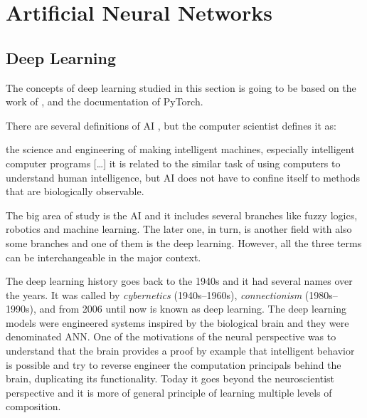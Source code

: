 \section{Artificial Neural Networks}\label{sec:ann}

\subsection{Deep Learning}\label{sec:deep_learning}

The concepts of deep learning studied in this section is going to be based on the work of \textcite{goodfellow2016}, \textcite{haykin1999} and the documentation of PyTorch.

There are several definitions of AI \cite{winston1992}, but the  computer scientist \textcite{mccarthy2007} defines it as:
%
\begin{citacao}[english]
    [\ldots] the science and engineering of making intelligent machines, especially intelligent computer programs [\ldots] it is related to the similar task of using computers to understand human intelligence, but AI does not have to confine itself to methods that are biologically observable.
\end{citacao}
The big area of study is the AI and it includes several branches like fuzzy logics, robotics and machine learning.
The later one, in turn, is another field with also some branches and one of them is the deep learning.
However, all the three terms can be interchangeable in the major context.

The deep learning history goes back to the 1940s and it had several names over the years. 
It was called by \emph{cybernetics} (1940s--1960s), \emph{connectionism} (1980s--1990s), and from 2006 until now is known as deep learning.
The deep learning models were engineered systems inspired by the biological brain and they were denominated ANN.
One of the motivations of the neural  perspective was to understand that the brain provides a proof by example that intelligent behavior is possible and try to reverse engineer the computation principals behind the brain, duplicating its functionality.
Today it goes beyond the neuroscientist perspective and it is more of general principle of learning multiple levels of composition.

